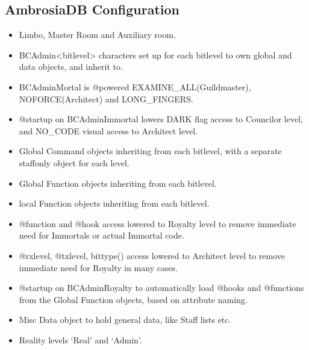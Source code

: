 \documentclass[letterpaper,10pt,english]{sphinxmanual}
\begin{document}
\subsection{AmbrosiaDB Configuration}
\label{\detokenize{ambrosiadb:ambrosiadb-configuration}}\begin{itemize}
\item {} 
\sphinxAtStartPar
Limbo, Master Room and Auxiliary room.

\item {} 
\sphinxAtStartPar
BC\sphinxhyphen{}Admin\sphinxhyphen{}\textless{}bitlevel\textgreater{} characters set up for each bitlevel to own global and
data objects, and inherit to.

\item {} 
\sphinxAtStartPar
BC\sphinxhyphen{}Admin\sphinxhyphen{}Mortal is @powered EXAMINE\_ALL(Guildmaster), NOFORCE(Architect) and
LONG\_FINGERS.

\item {} 
\sphinxAtStartPar
@startup on BC\sphinxhyphen{}Admin\sphinxhyphen{}Immortal lowers DARK flag access to Councilor level, and
NO\_CODE visual access to Architect level.

\item {} 
\sphinxAtStartPar
Global Command objects inheriting from each bitlevel, with a separate staff\sphinxhyphen{}only object for each level.

\item {} 
\sphinxAtStartPar
Global Function objects inheriting from each bitlevel.

\item {} 
\sphinxAtStartPar
local Function objects inheriting from each bitlevel.

\item {} 
\sphinxAtStartPar
@function and @hook access lowered to Royalty level to remove immediate need
for Immortals or actual Immortal code.

\item {} 
\sphinxAtStartPar
@rxlevel, @txlevel, bittype() access lowered to Architect level to remove
immediate need for Royalty in many cases.

\item {} 
\sphinxAtStartPar
@startup on BC\sphinxhyphen{}Admin\sphinxhyphen{}Royalty to automatically load @hooks and @functions from
the Global Function objects, based on attribute naming.

\item {} 
\sphinxAtStartPar
Misc Data object to hold general data, like Staff lists etc.

\item {} 
\sphinxAtStartPar
Reality levels ‘Real’ and ‘Admin’.

\end{itemize}
\end{document}
